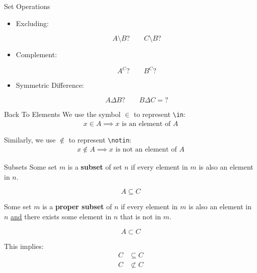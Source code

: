 \documentclass[10pt]{beamer}
\begin{document}
\begin{frame}{Set Operations}


    \begin{itemize}
        \item Excluding:

        \[A \setminus B ? \quad \quad C\setminus B ?\]
        
        \item Complement:

        \[A^C  ? \quad \quad B^C  ?\]

        \item Symmetric Difference:

        \[A \Delta B ? \quad \quad B \Delta C = ?\]
    \end{itemize}
\end{frame}

\begin{frame}[fragile]{Back To Elements}
    We use the symbol $\in$ to represent \verb|\in|:
    \begin{align*}
        x \in A \implies x \text{ is an element of }A
    \end{align*}

    Similarly, we use $\notin$ to represent \verb|\notin|:
    \begin{align*}
        x \notin A \implies x \text{ is not an element of }A
    \end{align*}
\end{frame}

\begin{frame}{Subsets}
    Some set $m$ is a \textbf{subset} of set $n$ if every element in $m$ is also an element in $n$.

    \[A \subseteq C\]

    Some set $m$ is a \textbf{proper subset} of $n$ if every element in $m$ is also an element in $n$ \underline{and} there exists some element in $n$ that is not in $m$.

    \[A \subset C\]

    This implies:
    \begin{align*}
        C &\subseteq C \\
        C &\not\subset C
    \end{align*}
\end{frame}
\end{document}
